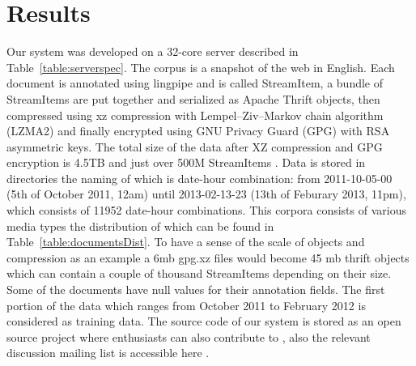 
\section{Results}
\label{sec:results}

 Our system was developed on a 32-core server described in
 Table~\ref{table:serverspec}. The corpus is a snapshot of the web in English.
 Each document is annotated using lingpipe and is called StreamItem, a bundle of 
StreamItems are put together and serialized as Apache Thrift objects, then 
compressed using xz compression with Lempel–Ziv–Markov chain algorithm (LZMA2) 
and finally encrypted using GNU Privacy Guard (GPG) with RSA asymmetric keys.
The total size of the data after XZ compression and GPG encryption is 4.5TB and
just over 500M StreamItems \cite{s3}. Data is stored in directories the naming
of which is date-hour combination: from 2011-10-05-00 (5th of October 2011, 12am)
until 2013-02-13-23 (13th of Feburary 2013, 11pm), which consists of 11952
date-hour combinations. This corpora consists of various media types the
distribution of which can be found in Table~\ref{table:documentsDist}. To have a
sense of the scale of objects and compression as an example a 6mb
gpg.xz files would become 45 mb thrift objects which can contain a couple of 
thousand StreamItems depending on their size. Some of the documents have null 
values for their annotation fields. The first portion of the data which 
ranges from October 2011 to February 2012 is considered as training data.
The source code of our system is stored as an open source project where
enthusiasts can also contribute to \cite{github}, also the relevant discussion
mailing list is accessible here \cite{googlegroups}.
 
